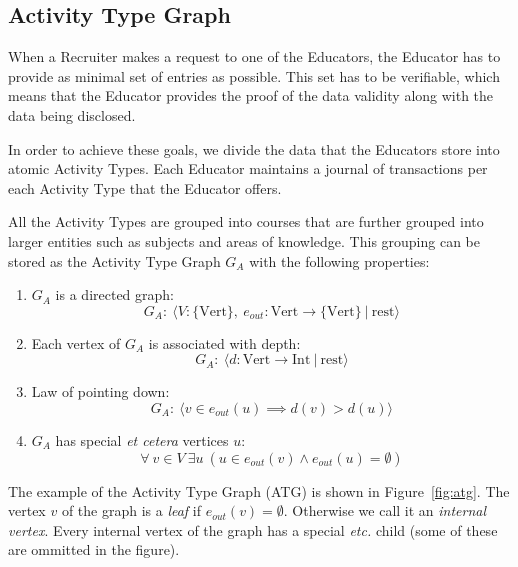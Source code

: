 \subsection{Activity Type Graph}
\label{sec:ATG}
When a Recruiter makes a request to one of the Educators, the Educator has to provide as minimal set of entries as possible. This set has to be verifiable, which means that the Educator provides the proof of the data validity along with the data being disclosed.

In order to achieve these goals, we divide the data that the Educators store into atomic Activity Types. Each Educator maintains a journal of transactions per each Activity Type that the Educator offers.

All the Activity Types are grouped into courses that are further grouped into larger entities such as subjects and areas of knowledge. This grouping can be stored as the Activity Type Graph $G_A$ with the following properties:
\begin{enumerate}[label=\arabic*${}^\circ$]
\item $G_A$ is a directed graph:
  \begin{equation}
  G_A:\ \langle V: \{\mathrm{Vert}\},\ e_{out}: \mathrm{Vert} \rightarrow \{\mathrm{Vert}\}\ |\ \mathrm{rest} \rangle
  \end{equation}

\item Each vertex of $G_A$ is associated with depth:
  \begin{equation}
  G_A:\ \langle d: \mathrm{Vert} \rightarrow \mathrm{Int}\ |\ \mathrm{rest}  \rangle
  \end{equation}

\item Law of pointing down:
  \begin{equation}
  G_A:\ \langle v \in e_{out}(u) \implies d(v) > d(u) \rangle
  \end{equation}

\item $G_A$ has special \textit{et cetera} vertices $u$:
  \begin{equation}
  \forall\ v \in V\ \exists u\ (u \in e_{out}(v) \land e_{out}(u) = \emptyset)
  \end{equation}
\end{enumerate}

The example of the Activity Type Graph (ATG) is shown in Figure~\ref{fig:atg}. The vertex $v$ of the graph is a \textit{leaf} if $e_{out}(v) = \emptyset$. Otherwise we call it an \textit{internal vertex}. Every internal vertex of the graph has a special \textit{etc.} child (some of these are ommitted in the figure).

